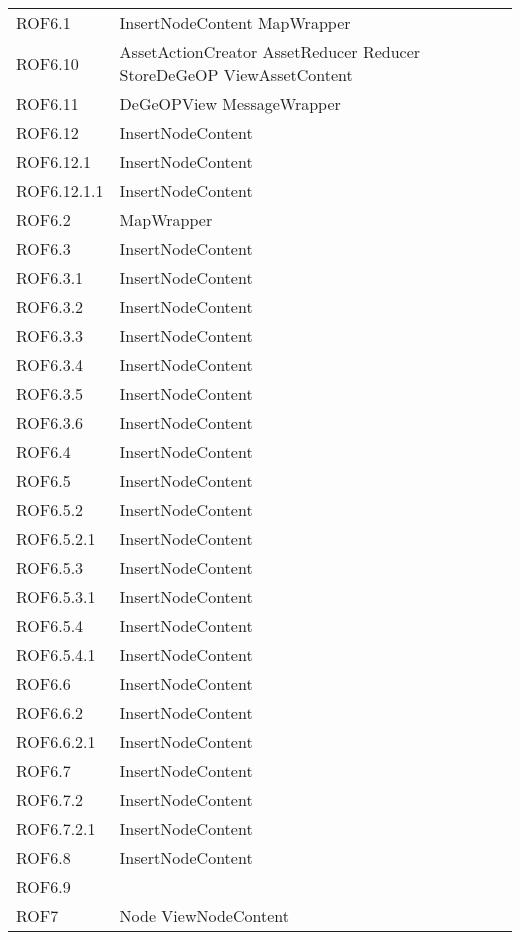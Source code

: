 \begin{longtable}{p{2.5cm}!{\VRule[1pt]}p{5cm}}
	ROF6.1 & InsertNodeContent \newline MapWrapper\\
	ROF6.10 & AssetActionCreator \newline AssetReducer \newline Reducer \newline StoreDeGeOP \newline ViewAssetContent\\
	ROF6.11 & DeGeOPView \newline MessageWrapper\\
	ROF6.12 & InsertNodeContent\\
	ROF6.12.1 & InsertNodeContent\\
	ROF6.12.1.1 & InsertNodeContent\\
	ROF6.2 & MapWrapper\\
	ROF6.3 & InsertNodeContent\\
	ROF6.3.1 & InsertNodeContent\\
	ROF6.3.2 & InsertNodeContent\\
	ROF6.3.3 & InsertNodeContent\\
	ROF6.3.4 & InsertNodeContent\\
	ROF6.3.5 & InsertNodeContent\\
	ROF6.3.6 & InsertNodeContent\\
	ROF6.4 & InsertNodeContent\\
	ROF6.5 & InsertNodeContent\\
	ROF6.5.2 & InsertNodeContent\\
	ROF6.5.2.1 & InsertNodeContent\\
	ROF6.5.3 & InsertNodeContent\\
	ROF6.5.3.1 & InsertNodeContent\\
	ROF6.5.4 & InsertNodeContent\\
	ROF6.5.4.1 & InsertNodeContent\\
	ROF6.6 & InsertNodeContent\\
	ROF6.6.2 & InsertNodeContent\\
	ROF6.6.2.1 & InsertNodeContent\\
	ROF6.7 & InsertNodeContent\\
	ROF6.7.2 & InsertNodeContent\\
	ROF6.7.2.1 & InsertNodeContent\\
	ROF6.8 & InsertNodeContent\\
	ROF6.9 & \\
	ROF7 & Node \newline ViewNodeContent\\

\end{longtable}
